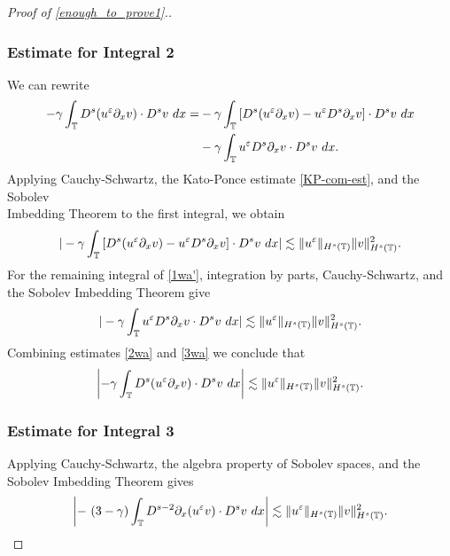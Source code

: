\begin{proof}[Proof of \eqref{enough_to_prove1}.]
\subsubsection{Estimate for Integral 2} We can rewrite
%
%
\begin{equation}
\begin{split}
-\gamma \int_{\mathbb{T}} D^s (u^\varepsilon \partial_x v) \cdot D^s v \
dx
= & -\gamma \int_{\mathbb{T}} \left[ D^s(u^\varepsilon \partial_x v) - u^\varepsilon D^s
\partial_x v \right] \cdot D^s v \ dx
\\
& -  \gamma \int_{\mathbb{T}} u^\varepsilon D^s \partial_x v \cdot D^s v \ dx.
\label{1wa'}
\end{split}
\end{equation}
%
%
Applying Cauchy-Schwartz, the Kato-Ponce estimate \eqref{KP-com-est}, and 
the Sobolev \\ Imbedding Theorem to 
the first integral, we obtain
%
%
%
%
\begin{equation}
\begin{split}
| -\gamma \int_{\mathbb{T}} \left[ D^s(u^\varepsilon \partial_x v) - u^\varepsilon D^s
\partial_x v \right] \cdot D^s v \ dx |
\lesssim \|u^\varepsilon \|_{H^s(\mathbb{T})} \|v\|_{H^s(\mathbb{T})}^2.
\label{2wa}
\end{split}
\end{equation}
%
%
For the remaining integral of \eqref{1wa'}, integration by parts, 
Cauchy-Schwartz, and the Sobolev Imbedding Theorem give
%
%
\begin{equation}
\begin{split}
| - \gamma \int_{\mathbb{T}} u^\varepsilon D^s \partial_x v \cdot D^s v \ dx |
\lesssim \|u^\varepsilon \|_{H^s(\mathbb{T})} \|v\|_{H^s(\mathbb{T})}^2.
\label{3wa}
\end{split}
\end{equation}
%
%
Combining estimates \eqref{2wa} and \eqref{3wa} we conclude that
%
%
\begin{equation}
\begin{split}
\left | -\gamma \int_{\mathbb{T}} D^s (u^\varepsilon \partial_x v) \cdot D^s v \
dx \right |
 \lesssim \|u^\varepsilon \|_{H^s(\mathbb{T})} \|v\|_{H^s(\mathbb{T})}^2.
\label{4wa}
\end{split}
\end{equation}
%
%
\subsubsection{Estimate for Integral 3} Applying Cauchy-Schwartz, the 
algebra property of Sobolev spaces, and the Sobolev Imbedding Theorem gives
%
%
\begin{equation}
\begin{split}
\left |- \ ( 3- \gamma) \int_{\mathbb{T}} D^{s-2} \partial_x (u^\varepsilon v) \cdot D^s
v \ dx \right |  \lesssim \|u^\varepsilon\|_{H^{s}(\mathbb{T})} \|v\|_{H^{s}(\mathbb{T})}^2.
\label{13u}
\end{split}
\end{equation}
%
%
%
%
%
%

\end{proof}
